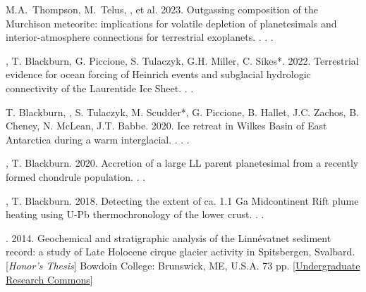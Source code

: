 \begin{etaremune} [itemsep=4pt, leftmargin=3ex]
    \item M.A.~Thompson, M.~Telus, \ghedwards, et al. 2023. Outgassing composition of the Murchison meteorite: implications for volatile depletion of planetesimals and interior-atmosphere connections for terrestrial exoplanets. . . .
    
    \item \ghedwards, T. Blackburn, G. Piccione, S. Tulaczyk, G.H. Miller, C. Sikes*. 2022. Terrestrial evidence for ocean forcing of Heinrich events and subglacial hydrologic connectivity of the Laurentide Ice Sheet. . .
    
    \item T. Blackburn, \ghedwards, S. Tulaczyk, M. Scudder*, G. Piccione, B. Hallet, J.C. Zachos, B. Cheney, N. McLean, J.T. Babbe. 2020. Ice retreat in Wilkes Basin of East Antarctica during a warm interglacial. . . .
    
    \item \ghedwards, T. Blackburn. 2020. Accretion of a large LL parent planetesimal from a recently formed chondrule population. . .
    
    \item \ghedwards, T. Blackburn. 2018. Detecting the extent of ca. 1.1 Ga Midcontinent Rift plume heating using U-Pb thermochronology of the lower crust. . .
    


\end{etaremune}

\begin{etaremune} [itemsep=4pt, leftmargin=3ex]
    \item \ghedwards. 2014. Geochemical and stratigraphic analysis of the Linnévatnet sediment record: a study of Late Holocene cirque glacier activity in Spitsbergen, Svalbard. [\textit{Honor’s Thesis}] Bowdoin College: Brunswick, ME, U.S.A. 73 pp. [\href{https://digitalcommons.bowdoin.edu/honorsprojects/12/}{Undergraduate Research Commons}]
\end{etaremune}
